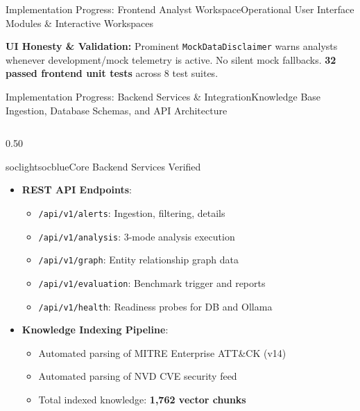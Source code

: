 \documentclass[aspectratio=169, 10pt]{beamer}
\begin{document}
\begin{frame}{Implementation Progress: Frontend Analyst Workspace}{Operational User Interface Modules \& Interactive Workspaces}
  \vspace{0.12cm}
  \begin{tcolorbox}[colback=socgreen!10,colframe=socgreen!80!black,boxrule=0.6pt,arc=1mm,top=3pt,bottom=3pt,left=6pt,right=6pt]
    \scriptsize\textbf{UI Honesty \& Validation:} Prominent \texttt{MockDataDisclaimer} warns analysts whenever development/mock telemetry is active. No silent mock fallbacks. \textbf{32 passed frontend unit tests} across 8 test suites.
  \end{tcolorbox}
\end{frame}

\begin{frame}{Implementation Progress: Backend Services \& Integration}{Knowledge Base Ingestion, Database Schemas, and API Architecture}
  \begin{columns}[T]
    \begin{column}{0.50\textwidth}
      \begin{cardbox}{soclight}{socblue}{Core Backend Services Verified}
        \begin{itemize}\setlength{\itemsep}{1.5pt}
          \item \textbf{REST API Endpoints}:
            \begin{itemize}\tiny
              \item \texttt{/api/v1/alerts}: Ingestion, filtering, details
              \item \texttt{/api/v1/analysis}: 3-mode analysis execution
              \item \texttt{/api/v1/graph}: Entity relationship graph data
              \item \texttt{/api/v1/evaluation}: Benchmark trigger and reports
              \item \texttt{/api/v1/health}: Readiness probes for DB and Ollama
            \end{itemize}
          \item \textbf{Knowledge Indexing Pipeline}:
            \begin{itemize}\tiny
              \item Automated parsing of MITRE Enterprise ATT\&CK (v14)
              \item Automated parsing of NVD CVE security feed
              \item Total indexed knowledge: \textbf{1,762 vector chunks}
            \end{itemize}
        \end{itemize}
      \end{cardbox}
    \end{column}


\end{columns}
\end{frame}
\end{document}
